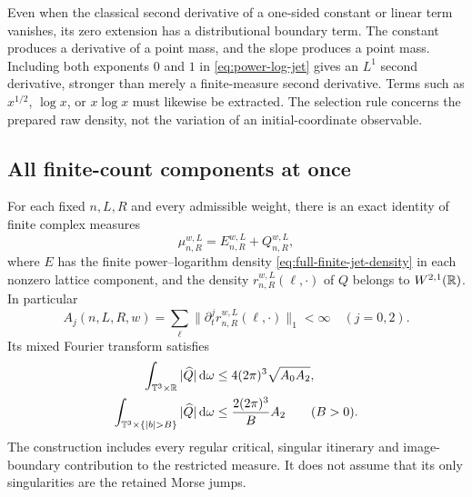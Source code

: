 \begin{remark}
\label{rem:constant-slope-extraction}
Even when the classical second derivative of a one-sided constant or
linear term vanishes, its zero extension has a distributional boundary
term. The constant produces a derivative of a point mass, and the slope
produces a point mass. Including both exponents $0$ and $1$ in
\eqref{eq:power-log-jet} gives an $L^1$ second derivative, stronger than
merely a finite-measure second derivative. Terms such as
$x^{1/2}$, $\log x$, or $x\log x$ must likewise be extracted. The
selection rule concerns the prepared raw density, not the variation of
an initial-coordinate observable.
\end{remark}

\subsection{All finite-count components at once}
\begin{theorem}
\label{thm:finite-count-raw-extraction}
For each fixed $n,L,R$ and every admissible weight, there is an exact
identity of finite complex measures
\begin{equation}\label{eq:finite-count-exact-extraction}
 \mu_{n,R}^{w,L}=E_{n,R}^{w,L}+Q_{n,R}^{w,L},
\end{equation}
where $E$ has the finite power--logarithm density
\eqref{eq:full-finite-jet-density} in each nonzero lattice component,
and the density $r_{n,R}^{w,L}(\ell,\cdot)$ of $Q$ belongs to
$W^{2,1}(\mathbb R)$. In particular
\begin{equation}\label{eq:finite-count-residual-norms}
 A_j(n,L,R,w)=\sum_\ell\|\partial_t^j
                              r_{n,R}^{w,L}(\ell,\cdot)\|_1<\infty
 \quad(j=0,2).
\end{equation}
Its mixed Fourier transform satisfies
\begin{align}
 \int_{\T^3\times\R}|\widehat Q|\dd\omega
 &\le4(2\pi)^3\sqrt{A_0A_2},
       \label{eq:finite-count-Fourier-integrable}\\
 \int_{\T^3\times\{|b|>B\}}|\widehat Q|\dd\omega
 &\le\frac{2(2\pi)^3}{B}A_2\qquad(B>0).
       \label{eq:finite-count-far-tail}
\end{align}
The construction includes every regular critical, singular itinerary
and image-boundary contribution to the restricted measure. It does
not assume that its only singularities are the retained Morse jumps.
\end{theorem}
